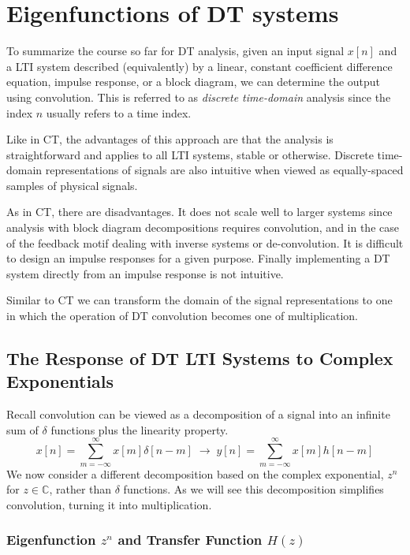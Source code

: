\section{Eigenfunctions of DT systems}
To summarize the course so far for DT analysis, given an input signal $x[n]$ and a LTI system described (equivalently) by a linear, constant coefficient difference equation, impulse response, or a block diagram, we can determine the output using convolution. This is referred to as \emph{discrete time-domain} analysis since the index $n$ usually refers to a time index.

Like in CT, the advantages of this approach are that the analysis is straightforward and applies to all LTI systems, stable or otherwise. Discrete time-domain representations of signals are also intuitive when viewed as equally-spaced samples of physical signals.

As in CT, there are disadvantages. It does not scale well to larger systems since analysis with block diagram decompositions requires convolution, and in the case of the feedback motif dealing with inverse systems or de-convolution. It is difficult to design an impulse responses for a given purpose. Finally implementing a DT system directly from an impulse response is not intuitive.

Similar to CT we can transform the domain of the signal representations to one in which the operation of DT convolution becomes one of multiplication.

\subsection{The Response of DT LTI Systems to Complex Exponentials}

Recall convolution can be viewed as a decomposition of a signal into an infinite sum of $\delta$ functions plus the linearity property.
\[
x[n] = \sum\limits_{m = -\infty}^{\infty} x[m]\delta[n-m] \;\longrightarrow\; y[n] = \sum\limits_{m = -\infty}^{\infty} x[m]h[n-m]
\]  
We now consider a different decomposition based on the complex exponential, $z^n$ for $z \in \mathbb{C}$, rather than $\delta$ functions. As we will see this decomposition simplifies convolution, turning it into multiplication.

\subsubsection{Eigenfunction $z^n$ and Transfer Function $H(z)$}

